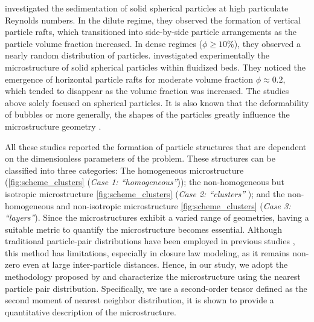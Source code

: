 \citet{shajahan2023inertial} investigated the sedimentation of solid spherical particles at high particulate Reynolds numbers.
In the dilute regime, they observed the formation of vertical particle rafts, which transitioned into side-by-side particle arrangements as the particle volume fraction increased. In dense regimes ($\phi \geq 10 \%$), they observed a nearly random distribution of particles. %
\citet{almeras2021statistics} investigated experimentally the microstructure of solid spherical particles within fluidized beds. They noticed the emergence of horizontal particle rafts for moderate volume fraction $\phi \approx 0.2$, which tended to disappear as the volume fraction was increased.  %
The studies above solely focused on spherical particles.
It is also known that the deformability of bubbles or more generally, the shapes of the particles greatly influence the microstructure geometry \citep{bunner2003effect,seyed2021sedimentation}.

All these studies reported the formation of particle structures that are dependent on the dimensionless parameters of the problem.
These structures can be classified into three categories: The homogeneous microstructure (\ref{fig:scheme_clusters} (\textit{Case 1: ``homogeneous''})); the non-homogeneous but isotropic microstructure \ref{fig:scheme_clusters} (\textit{Case 2: ``clusters'' }); and the non-homogeneous and non-isotropic microstructure \ref{fig:scheme_clusters} (\textit{Case 3: ``layers''}).
Since the microstructures exhibit a varied range of geometries, having a suitable metric to quantify the microstructure becomes essential. 
Although traditional particle-pair distributions have been employed in previous studies \citep{yin2007,cartellier2009induced, seyed2021sedimentation}, this method has limitations, especially in closure law modeling, as it remains non-zero even at large inter-particle distances. 
Hence, in our study, we adopt the methodology proposed by \citep{zhang2023evolution} and characterize the microstructure using the nearest particle pair distribution.
Specifically, we use a second-order tensor defined as the second moment of nearest neighbor distribution, it is shown to provide a quantitative description of the microstructure.

